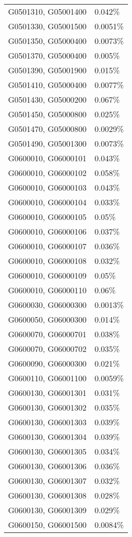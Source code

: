 \begin{longtable}[]{@{}ll@{}}
G0501310, G05001400 & 0.042\% \\
G0501330, G05001500 & 0.0051\% \\
G0501350, G05000400 & 0.0073\% \\
G0501370, G05000400 & 0.005\% \\
G0501390, G05001900 & 0.015\% \\
G0501410, G05000400 & 0.0077\% \\
G0501430, G05000200 & 0.067\% \\
G0501450, G05000800 & 0.025\% \\
G0501470, G05000800 & 0.0029\% \\
G0501490, G05001300 & 0.0073\% \\
G0600010, G06000101 & 0.043\% \\
G0600010, G06000102 & 0.058\% \\
G0600010, G06000103 & 0.043\% \\
G0600010, G06000104 & 0.033\% \\
G0600010, G06000105 & 0.05\% \\
G0600010, G06000106 & 0.037\% \\
G0600010, G06000107 & 0.036\% \\
G0600010, G06000108 & 0.032\% \\
G0600010, G06000109 & 0.05\% \\
G0600010, G06000110 & 0.06\% \\
G0600030, G06000300 & 0.0013\% \\
G0600050, G06000300 & 0.014\% \\
G0600070, G06000701 & 0.038\% \\
G0600070, G06000702 & 0.035\% \\
G0600090, G06000300 & 0.021\% \\
G0600110, G06001100 & 0.0059\% \\
G0600130, G06001301 & 0.031\% \\
G0600130, G06001302 & 0.035\% \\
G0600130, G06001303 & 0.039\% \\
G0600130, G06001304 & 0.039\% \\
G0600130, G06001305 & 0.034\% \\
G0600130, G06001306 & 0.036\% \\
G0600130, G06001307 & 0.032\% \\
G0600130, G06001308 & 0.028\% \\
G0600130, G06001309 & 0.029\% \\
G0600150, G06001500 & 0.0084\% \\

\end{longtable}
